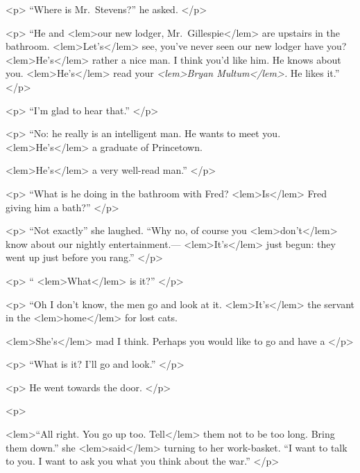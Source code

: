 {{				<p>
				“Where is Mr.\ Stevens?” he asked. 
 				</p> 

				<p>
				“He and 
<lem>our new lodger, Mr.\ Gillespie</lem>
					{} 
				are upstairs in the bathroom. 
<lem>Let's</lem>{} see, you've 
				never seen our new lodger have you? 
<lem>He's</lem>{} rather a nice man. I think you'd like him. He 
				knows about you. 
<lem>He's</lem>{} read your \emph{
<lem>Bryan Multum</lem>{}.} He likes it.” 
 				</p> 

				<p>
				“I'm glad to hear that.” 
 				</p> 

				<p>
				“No: he really is an intelligent man. He wants to meet you. 
<lem>He's</lem>{} a graduate of Princetown. 
				
<lem>He's</lem>{} a very well-read man.” 
 				</p> 

				<p>
				“What is he doing in the bathroom with Fred? 
<lem>Is</lem>
					{} 
				Fred giving him a bath?” 
				</p> 

				<p>
“Not exactly” she laughed. “Why no, of course you 
<lem>don't</lem>{} know about our nightly 
				entertainment.---
<lem>It's</lem>{} just begun: they went up just before you rang.” 
 				</p> 

				<p>
				“
<lem>What</lem>{} is it?” 
 				</p> 

				<p>
				“Oh I don't know, the men go and look at it. 
<lem>It's</lem>{} the servant in the 
<lem>home</lem>
					{} 
				for lost cats. 
				
<lem>She's</lem>{} mad I think. Perhaps you would like to go and have a 
					{} 
				</p> 

				<p>
				“What is it? I'll go and look.” 
 				</p> 

				<p>
				He went towards the door. 
 				</p> 

				<p>
				 
<lem>“All right. You go up too. Tell</lem>
					{} 
				them not to be too long. Bring them down.” she 
<lem>said</lem> 
					{} 
				turning to her work-basket. 
				“I want to talk to you. I want to ask you what you think about the war.” 
				</p> 

}}
